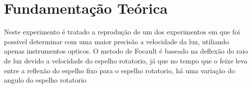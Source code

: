 \section{Fundamentação Teórica}
Neste experimento é tratado a reprodução de um dos experimentos em que foi possivel determinar com uma maior precisão a velocidade da luz, utiliando apenas instrumentos opticos. O metodo de Focault é baseado na deflexão do raio de luz devido a velocidade do espelho rotatorio, já que no tempo que o feixe leva entre a reflexão do espelho fixo para o espelho rotatorio, há uma variação do angulo do espelho rotatorio
